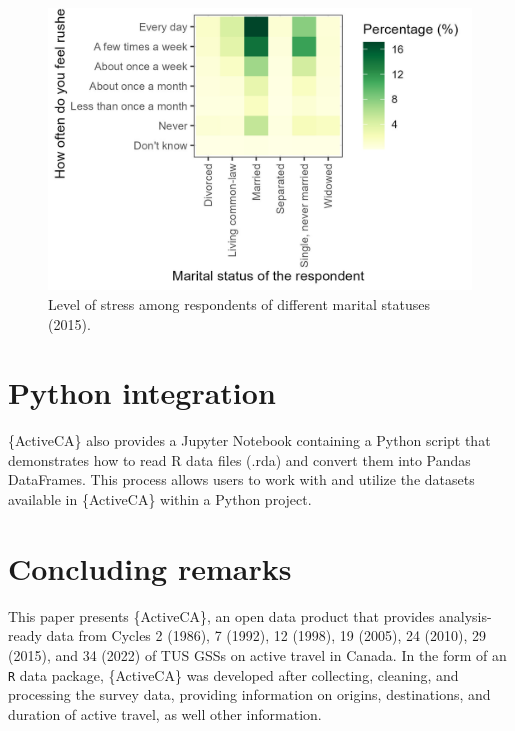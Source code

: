 \documentclass[Royal,times,sageh]{sagej}
\begin{document}
\begin{figure}

{\centering \includegraphics[width=1\linewidth]{Manuscript-figures/main_stress_figure} 

}

\caption{Level of stress among respondents of different marital statuses (2015).}\label{fig:figure-stress}
\end{figure}

\section{Python integration}\label{python-integration}

\{ActiveCA\} also provides a Jupyter Notebook containing a Python script
that demonstrates how to read R data files (.rda) and convert them into
Pandas DataFrames. This process allows users to work with and utilize
the datasets available in \{ActiveCA\} within a Python project.

\section{Concluding remarks}\label{concluding-remarks}

This paper presents \{ActiveCA\}, an open data product that provides
analysis-ready data from Cycles 2 (1986), 7 (1992), 12 (1998), 19
(2005), 24 (2010), 29 (2015), and 34 (2022) of TUS GSSs on active travel
in Canada. In the form of an \texttt{R} data package, \{ActiveCA\} was
developed after collecting, cleaning, and processing the survey data,
providing information on origins, destinations, and duration of active
travel, as well other information.
\end{document}
